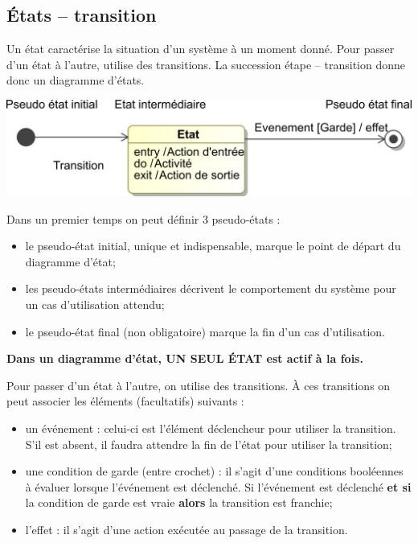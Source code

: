 \documentclass[10pt,fleqn]{article} %
\begin{document}
\subsection{États -- transition}
\begin{defi}
Un état caractérise la situation d'un système à un moment donné. Pour passer d'un état à l'autre,  utilise des transitions. La succession étape -- transition donne donc un diagramme d'états. 

\begin{center}
\includegraphics[width=.8\textwidth]{images/stm_def}
\end{center}

Dans un premier temps on peut définir 3 pseudo-états : 
\begin{itemize}
\item le pseudo-état initial, unique et indispensable, marque le point de départ du diagramme d'état;
\item les pseudo-états intermédiaires décrivent le comportement du système pour un cas d'utilisation attendu;
\item le pseudo-état final (non obligatoire) marque la fin d'un cas d'utilisation.
\end{itemize}

\textbf{Dans un diagramme d'état, UN SEUL ÉTAT est actif à la fois.}

Pour passer d'un état à l'autre, on utilise des transitions. À ces transitions on peut associer les éléments (facultatifs) suivants :
\begin{itemize}
\item un événement : celui-ci est l'élément déclencheur pour utiliser la transition. S'il est absent, il faudra attendre la fin de l'état pour utiliser la transition;
\item une condition de garde (entre crochet) : il s'agit d'une conditions booléennes à évaluer lorsque l'événement est déclenché. Si l'événement est déclenché \textbf{et si} la condition de garde est vraie \textbf{alors} la transition est franchie;
\item l'effet : il s'agit d'une action exécutée au passage de la transition. 
\end{itemize}
\end{defi}
\end{document}
